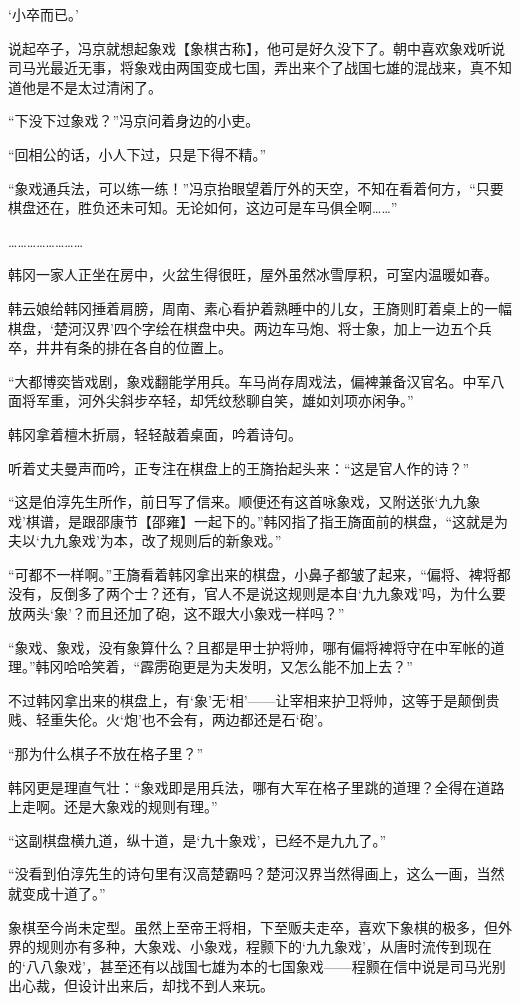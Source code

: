 ‘小卒而已。’

说起卒子，冯京就想起象戏【象棋古称】，他可是好久没下了。朝中喜欢象戏听说司马光最近无事，将象戏由两国变成七国，弄出来个了战国七雄的混战来，真不知道他是不是太过清闲了。

“下没下过象戏？”冯京问着身边的小吏。

“回相公的话，小人下过，只是下得不精。”

“象戏通兵法，可以练一练！”冯京抬眼望着厅外的天空，不知在看着何方，“只要棋盘还在，胜负还未可知。无论如何，这边可是车马俱全啊……”

……………………

韩冈一家人正坐在房中，火盆生得很旺，屋外虽然冰雪厚积，可室内温暖如春。

韩云娘给韩冈捶着肩膀，周南、素心看护着熟睡中的儿女，王旖则盯着桌上的一幅棋盘，‘楚河汉界’四个字绘在棋盘中央。两边车马炮、将士象，加上一边五个兵卒，井井有条的排在各自的位置上。

“大都博奕皆戏剧，象戏翻能学用兵。车马尚存周戏法，偏裨兼备汉官名。中军八面将军重，河外尖斜步卒轻，却凭纹愁聊自笑，雄如刘项亦闲争。”

韩冈拿着檀木折扇，轻轻敲着桌面，吟着诗句。

听着丈夫曼声而吟，正专注在棋盘上的王旖抬起头来：“这是官人作的诗？”

“这是伯淳先生所作，前日写了信来。顺便还有这首咏象戏，又附送张‘九九象戏’棋谱，是跟邵康节【邵雍】一起下的。”韩冈指了指王旖面前的棋盘，“这就是为夫以‘九九象戏’为本，改了规则后的新象戏。”

“可都不一样啊。”王旖看着韩冈拿出来的棋盘，小鼻子都皱了起来，“偏将、裨将都没有，反倒多了两个士？还有，官人不是说这规则是本自‘九九象戏’吗，为什么要放两头‘象’？而且还加了砲，这不跟大小象戏一样吗？”

“象戏、象戏，没有象算什么？且都是甲士护将帅，哪有偏将裨将守在中军帐的道理。”韩冈哈哈笑着，“霹雳砲更是为夫发明，又怎么能不加上去？”

不过韩冈拿出来的棋盘上，有‘象’无‘相’——让宰相来护卫将帅，这等于是颠倒贵贱、轻重失伦。火‘炮’也不会有，两边都还是石‘砲’。

“那为什么棋子不放在格子里？”

韩冈更是理直气壮：“象戏即是用兵法，哪有大军在格子里跳的道理？全得在道路上走啊。还是大象戏的规则有理。”

“这副棋盘横九道，纵十道，是‘九十象戏’，已经不是九九了。”

“没看到伯淳先生的诗句里有汉高楚霸吗？楚河汉界当然得画上，这么一画，当然就变成十道了。”

象棋至今尚未定型。虽然上至帝王将相，下至贩夫走卒，喜欢下象棋的极多，但外界的规则亦有多种，大象戏、小象戏，程颢下的‘九九象戏’，从唐时流传到现在的‘八八象戏’，甚至还有以战国七雄为本的七国象戏——程颢在信中说是司马光别出心裁，但设计出来后，却找不到人来玩。

